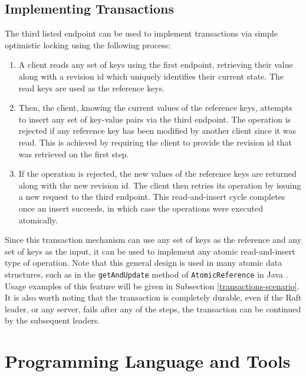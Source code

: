 \subsection{Implementing Transactions} \label{implementing-transactions}

The third listed endpoint can be used to implement transactions via simple optimistic locking \cite{kung1981optimistic} using the following process:
\begin{enumerate}
    \item A client reads any set of keys using the first endpoint, retrieving their value along with a revision id which uniquely identifies their current state. The read keys are used as the reference keys.
    \item Then, the client, knowing the current values of the reference keys, attempts to insert any set of key-value pairs via the third endpoint. The operation is rejected if any reference key has been modified by another client since it was read. This is achieved by requiring the client to provide the revision id that was retrieved on the first step.
    \item If the operation is rejected, the new values of the reference keys are returned along with the new revision id. The client then retries its operation by issuing a new request to the third endpoint. This read-and-insert cycle completes once an insert succeeds, in which case the operations were executed atomically.
\end{enumerate}

Since this transaction mechanism can use any set of keys as the reference and any set of keys as the input, it can be used to implement any atomic read-and-insert type of operation. Note that this general design is used in many atomic data structures, such as in the \lstinline|getAndUpdate| method of \lstinline|AtomicReference| in Java \cite{get-and-update}. Usage examples of this feature will be given in Subsection \ref{transactions-scenario}.\\

It is also worth noting that the transaction is completely durable, even if the Raft leader, or any server, fails after any of the steps, the transaction can be continued by the subsequent leaders.\\

\section{Programming Language and Tools} \label{language-tools}

